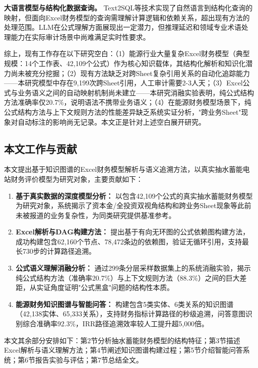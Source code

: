 \textbf{大语言模型与结构化数据查询。} Text2SQL等技术实现了自然语言到结构化查询的映射，但面向Excel财务模型的查询需理解计算逻辑和依赖关系，超出现有方法的处理范围。LLM在公式理解方面展现出一定潜力，但推理延迟和领域专业术语处理能力在实际审计场景中尚难满足实时性要求。

综上，现有工作存在以下研究空白：（1）能源行业大量复杂Excel财务模型（典型规模：14个工作表、42,109个公式）作为核心知识载体，其结构化解析和知识化潜力尚未被充分挖掘；（2）现有方法缺乏对跨Sheet复杂引用关系的自动化追踪能力——本研究模型中存在9,199次跨Sheet引用，人工审计需要2-3人天；（3）Excel公式与业务语义之间的自动映射机制尚未建立——本研究消融实验表明，纯公式结构方法准确率仅20.7\%，说明语法不携带业务语义；（4）在能源财务模型场景下，纯公式结构方法与上下文规则方法的性能差异缺乏系统实证分析，"跨业务Sheet"现象对自动标注的影响尚无记录。本文正是针对上述空白展开研究。

\subsection{\heiti 本文工作与贡献}

本文提出基于知识图谱的Excel财务模型解析与语义追溯方法，以真实抽水蓄能电站财务评价模型为研究对象，主要贡献如下：

\begin{enumerate}
	\item \textbf{基于真实数据的深度模型分析：} 以包含42,109个公式的真实抽水蓄能财务模型为研究对象，系统揭示了资本金/全投资双视角结构和跨业务Sheet现象等此前未被报道的业务复杂性，为同类研究提供基准参考。
	\item \textbf{Excel解析与DAG构建方法：} 提出基于有向无环图的公式依赖图构建方法，成功构建包含62,160个节点、78,472条边的依赖图，验证无循环引用，支持最长730步的计算路径追溯。
	\item \textbf{公式语义理解消融分析：} 通过299条分层采样数据集上的系统消融实验，揭示纯公式结构方法（准确率20.7\%）与上下文规则方法（88.3\%）之间的巨大差距，从实证角度证明"公式黑盒"问题的结构性本质。
	\item \textbf{能源财务知识图谱与智能问答：} 构建包含5类实体、6类关系的知识图谱（42,138实体、65,333关系），支持财务指标计算路径的秒级追溯，问答意图识别综合准确率92.3\%，IRR路径追溯效率较人工提升超5,000倍。
\end{enumerate}

本文其余部分安排如下：第2节分析抽水蓄能财务模型的结构特征；第3节描述Excel解析与语义理解方法；第4节阐述知识图谱构建过程；第5节介绍智能问答系统；第6节报告实验与评估；第7节总结全文。
